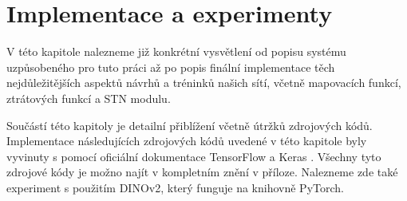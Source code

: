 \chapter{Implementace a experimenty}
\label{sec:Chapter5}
V této kapitole nalezneme již konkrétní vysvětlení od popisu systému uzpůsobeného pro tuto práci až po popis finální implementace těch nejdůležitějších aspektů návrhů a tréninků našich sítí, včetně mapovacích funkcí, ztrátových funkcí a STN modulu. 

Součástí této kapitoly je detailní přiblížení včetně útržků zdrojových kódů. Implementace následujících zdrojových kódů uvedené v této kapitole byly vyvinuty s pomocí oficiální dokumentace TensorFlow a Keras \cite{tensorflow_doc}. Všechny tyto zdrojové kódy je možno najít v kompletním znění v příloze. Nalezneme zde také experiment s použitím DINOv2, který funguje na knihovně PyTorch.

\endinput